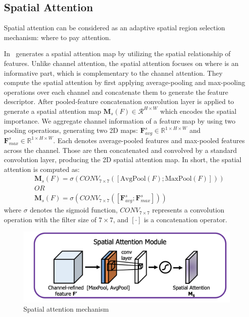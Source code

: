 \subsection{Spatial Attention}
Spatial attention can be considered as an adaptive spatial region selection mechanism: where to pay attention.

In~\cite{woo2018cbam} generates a spatial attention map by utilizing the spatial relationship of features. Unlike channel attention, the spatial attention focuses on where is an informative part, which is complementary to the channel attention. They compute the spatial attention by first applying average-pooling and max-pooling operations over each channel and concatenate them to generate the  feature descriptor. After pooled-feature concatenation convolution layer is applied to generate a spatial attention map $\textbf{M}_{s}\left(F\right) \in \mathcal{R}^{H×W}$ which encodes the spatial importance.
We aggregate channel information of a feature map by using two pooling operations, generating two 2D maps:
$\mathbf{F}^{s}_{avg} \in \mathbb{R}^{1\times{H}\times{W}}$
and $\mathbf{F}^{s}_{max} \in \mathbb{R}^{1\times{H}\times{W}}$. Each denotes average-pooled features and max-pooled features across the channel. Those are then concatenated and convolved by a standard convolution layer, producing the 2D spatial attention map. In short, the spatial attention is computed as:
\begin{equation}\begin{split}
    &\textbf{M}_{s}\left(F\right) = \sigma\left(CONV_{7\times7}\left(\left[\text{AvgPool}\left(F\right);\text{MaxPool}\left(F\right)\right]\right)\right) \\
    &OR\\
    & \textbf{M}_{s}\left(F\right) = \sigma\left(CONV_{7\times7}\left(\left[\mathbf{F}^{s}_{avg};\mathbf{F}^{s}_{max} \right]\right)\right) 
\end{split}\end{equation}
where $\sigma$ denotes the sigmoid function,  $CONV_{7\times7}$ represents a convolution operation with the filter size of $7\times7$, and $[\cdot]$ is a concatenation operator.
\begin{figure}
    \begin{center}
        \includegraphics[width=\textwidth]{Figures/SpatialAttentionExample.png}
        \caption{\label{fig:spattex} Spatial attention mechanism }
    \end{center}
\end{figure}

